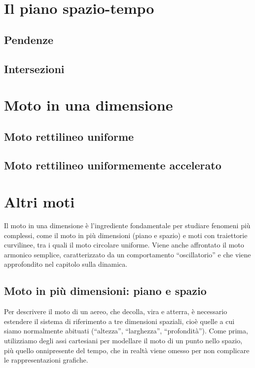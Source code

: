 \section{Il piano spazio-tempo}

\subsection{Pendenze}
\subsection{Intersezioni}

\section{Moto in una dimensione}
\subsection{Moto rettilineo uniforme}
\subsection{Moto rettilineo uniformemente accelerato}


\section{Altri moti}
Il moto in una dimensione è l'ingrediente fondamentale per studiare
fenomeni più complessi, come il moto in più dimensioni (piano e spazio)
e moti con traiettorie curvilinee, tra i quali il moto circolare
uniforme. Viene anche affrontato il moto armonico semplice, caratterizzato
da un comportamento ``oscillatorio'' e che viene approfondito nel
capitolo sulla dinamica.

\subsection{Moto in più dimensioni: piano e spazio}
Per descrivere il moto di un aereo, che decolla, vira e atterra, è
necessario estendere il sistema di riferimento a tre dimensioni spaziali,
cioè quelle a cui siamo normalmente abituati (``altezza'', ``larghezza'',
``profondità''). Come prima, utilizziamo degli assi cartesiani per
modellare il moto di un punto nello spazio, più quello onnipresente
del tempo, che in realtà viene omesso per non complicare le rappresentazioni
grafiche.

